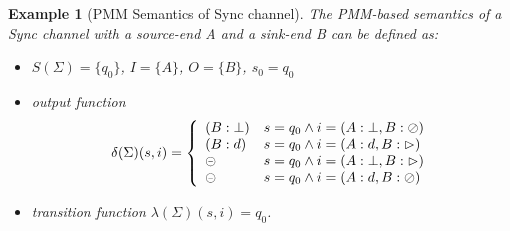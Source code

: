 \documentclass[conference, a4paper]{IEEEtran}
\newtheorem{example}{Example}
\newcommand{\rblock}[0]{\circleddash}
\newcommand{\rread}[0]{\rhd}
\newcommand{\rnoread}[0]{\oslash}
\begin{document}
\begin{example}[PMM Semantics of Sync channel]
  The PMM-based semantics of a Sync channel with a source-end A and a sink-end B can be defined as:
  \begin{itemize}
    \item[-] $S(\Sigma)=\{q_0\}$, $I=\{A\}$, $O=\{B\}$, $s_0=q_0$
    \item[-] output function
      \begin{displaymath}
        \delta(\Sigma)(s,i)=\left\{
        \begin{array}[ht]{ll}
          (B:\bot) & s=q_0\land i=(A:\bot,B:\rnoread) \\
          (B:d) & s=q_0\land i=(A:d,B:\rread)\\
          \rblock & s=q_0\land i=(A:\bot,B:\rread) \\
          \rblock & s=q_0\land i=(A:d,B:\rnoread) \\
        \end{array}
        \right.
      \end{displaymath}
    \item[-] transition function $\lambda(\Sigma)(s,i)=q_0$.
  \end{itemize}
\end{example}
\end{document}
